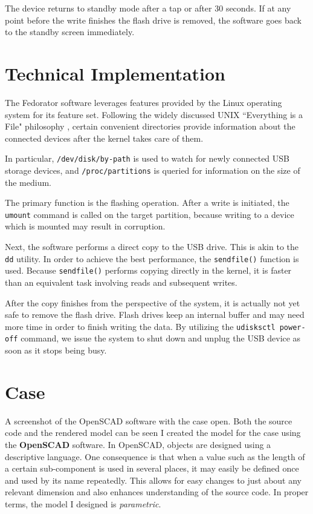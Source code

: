             The device returns to standby mode after a tap or after 30 seconds.  If at any point before the write finishes the flash drive is removed, the software goes back to the standby screen immediately.
            
        \section{Technical Implementation}
            The Fedorator software leverages features provided by the Linux operating system for its feature set.  Following the widely discussed UNIX ``Everything is a File" philosophy \cite{ph7spot-unix-file}, certain convenient directories provide information about the connected devices after the kernel takes care of them.
            
            In particular, \texttt{/dev/disk/by-path} is used to watch for newly connected USB storage devices, and \texttt{/proc/partitions} is queried for information on the size of the medium.
            
            The primary function is the flashing operation.  After a write is initiated, the \texttt{umount} command is called on the target partition, because writing to a device which is mounted may result in corruption.
            
             Next, the software performs a direct copy to the USB drive.  This is akin to the \texttt{dd} utility.  In order to achieve the best performance, the \texttt{sendfile()} \cite{man-sendfile} function is used.  Because \texttt{sendfile()} performs copying directly in the kernel, it is faster than an equivalent task involving reads and subsequent writes.
            
            After the copy finishes from the perspective of the system, it is actually not yet safe to remove the flash drive.  Flash drives keep an internal buffer and may need more time in order to finish writing the data.  By utilizing the \texttt{udisksctl power-off} command, we issue the system to shut down and unplug the USB device as soon as it stops being busy.
            
    \section{Case}
            {A screenshot of the OpenSCAD software with the case open.  Both the source code and the rendered model can be seen}
        I created the model for the case using the \textbf{OpenSCAD} software.  In OpenSCAD, objects are designed using a descriptive language.  One consequence is that when a value such as the length of a certain sub-component is used in several places, it may easily be defined once and used by its name repeatedly.  This allows for easy changes to just about any relevant dimension and also enhances understanding of the source code.  In proper terms, the model I designed is \textit{parametric}.
        
